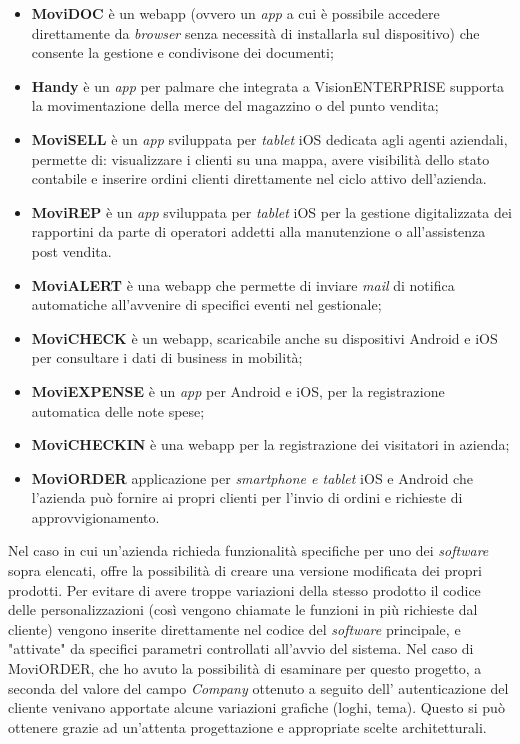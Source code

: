 \begin{itemize}
    \item \textbf{MoviDOC} è un \gls{webapp} (ovvero un \textit{app} a cui è possibile accedere direttamente da \textit{browser} senza 
          necessità di installarla sul dispositivo) che consente la gestione e condivisone dei documenti;
    \item \textbf{Handy} è un \textit{app} per palmare che integrata a VisionENTERPRISE supporta la movimentazione della merce del magazzino o del punto vendita;
    \item \textbf{MoviSELL} è un \textit{app} sviluppata per \textit{tablet} iOS dedicata agli agenti aziendali, permette di: visualizzare i 
          clienti su una mappa, avere visibilità dello stato contabile e inserire ordini clienti direttamente nel 
          ciclo attivo dell'azienda.
    \item \textbf{MoviREP} è un \textit{app} sviluppata per \textit{tablet} iOS per la gestione digitalizzata dei rapportini da parte di operatori addetti alla manutenzione o 
          all'assistenza post vendita. 
    \item \textbf{MoviALERT} è una \gls{webapp} che permette di inviare \textit{mail} di notifica automatiche all'avvenire di 
          specifici eventi nel gestionale;
    \item \textbf{MoviCHECK} è un \gls{webapp}, scaricabile anche su dispositivi Android e iOS per 
          consultare i dati di business in mobilità;
    \item \textbf{MoviEXPENSE} è un \textit{app} per Android e iOS, per la registrazione automatica delle note 
          spese;
    \item \textbf{MoviCHECKIN} è una \gls{webapp} per la registrazione dei visitatori in azienda;
    \item \textbf{MoviORDER} applicazione per \textit{smartphone e tablet} iOS e Android che l’azienda può fornire ai propri clienti per l’invio di ordini e 
          richieste di approvvigionamento.
\end{itemize}

Nel caso in cui un'azienda richieda funzionalità specifiche per uno dei \textit{software} sopra elencati, {\company} offre la possibilità di creare una versione 
modificata dei propri prodotti. Per evitare di avere troppe variazioni della stesso prodotto il codice delle personalizzazioni (così vengono chiamate le funzioni in 
più richieste dal cliente) vengono inserite direttamente nel codice del \textit{software} principale, e "attivate" da specifici parametri controllati all'avvio del 
sistema. Nel caso di MoviORDER, che ho avuto la possibilità di esaminare per questo progetto, a seconda del valore del campo \textit{Company} ottenuto a seguito dell'
autenticazione del cliente venivano apportate alcune variazioni grafiche (loghi, tema). Questo si può ottenere grazie ad un'attenta progettazione e appropriate scelte 
architetturali.

 